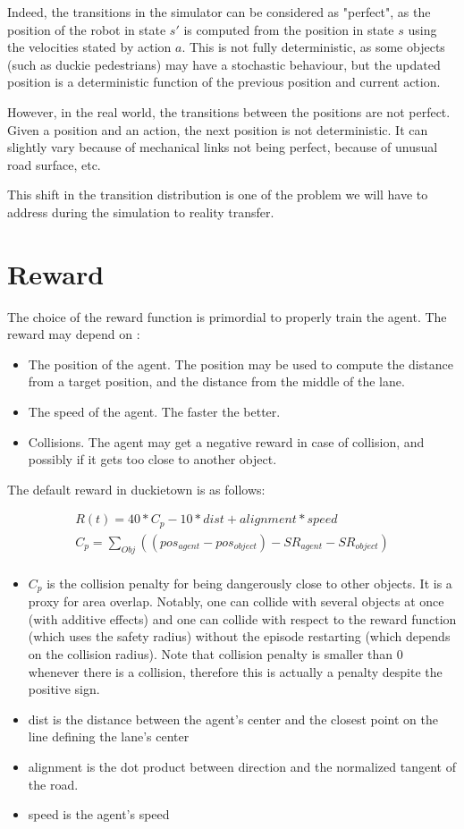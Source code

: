 Indeed, the transitions in the simulator can be considered as "perfect", as the position of the robot in state $s'$ is computed from the position in state $s$ using the velocities stated by action $a$.
This is not fully deterministic, as some objects (such as duckie pedestrians) may have a stochastic behaviour, but the updated position is a deterministic function of the previous position and current action.

However, in the real world, the transitions between the positions are not perfect.
Given a position and an action, the next position is not deterministic.
It can slightly vary because of mechanical links not being perfect, because of unusual road surface, etc.

This shift in the transition distribution is one of the problem we will have to address during the simulation to reality transfer.

\section{Reward}
The choice of the reward function is primordial to properly train the agent. The reward may depend on :

\begin{itemize}
    \item The position of the agent. The position may be used to compute the distance from a target position, and the distance from the middle of the lane.
    \item The speed of the agent. The faster the better.
    \item Collisions. The agent may get a negative reward in case of collision, and possibly if it gets too  close to another object.
\end{itemize}

The default reward in duckietown is as follows:

\begin{align}
R(t) = 40 * C_{p} - 10*dist + alignment*speed \\
C_p = \sum_{Obj} ((pos_{agent} - pos_{object}) - SR_{agent} - SR_{object}) \\
\end{align}
\begin{itemize}
    \item $C_p$ is the collision penalty for being dangerously close to other objects. It is a proxy for area overlap. Notably, one can collide with several objects at once (with additive effects) and one can collide with respect to the reward function (which uses the safety radius) without the episode restarting (which depends on the collision radius). Note that collision penalty is smaller than 0 whenever there is a collision, therefore this is actually a penalty despite the positive sign.
    \item dist is the distance between the agent's center and the closest point on the line defining the lane's center
    \item alignment is the dot product between direction and the normalized tangent of the road.
    \item speed is the agent's speed
\end{itemize}

